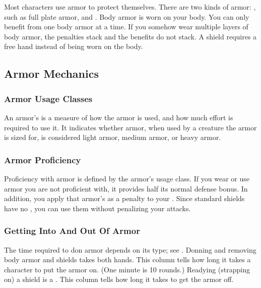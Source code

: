     Most characters use armor to protect themselves. There are two kinds of armor: , such as full plate armor, and .
    Body armor is worn on your body.
    You can only benefit from one body armor at a time.
    If you somehow wear multiple layers of body armor, the penalties stack and the benefits do not stack.
    A shield requires a free hand instead of being worn on the body.

    \subsection{Armor Mechanics}

        \subsubsection{Armor Usage Classes}\label{Armor Usage Classes}
            An armor's  is a measure of how the armor is used, and how much effort is required to use it.
            It indicates whether armor, when used by a creature the armor is sized for, is considered light armor, medium armor, or heavy armor.

        \subsubsection{Armor Proficiency}\label{Armor Proficiency}
            Proficiency with armor is defined by the armor's usage class.
            If you wear or use armor you are not proficient with, it provides half its normal defense bonus.
            In addition, you apply that armor's  as a penalty to your .
            Since standard shields have no , you can use them without penalizing your attacks.

        \subsubsection{Getting Into And Out Of Armor}
            The time required to don armor depends on its type; see . Donning and removing body armor and shields takes both hands.
             This column tells how long it takes a character to put the armor on. (One minute is 10 rounds.) Readying (strapping on) a shield is a .
             This column tells how long it takes to get the armor off.

